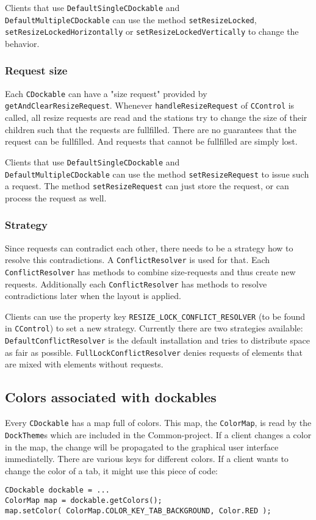 \documentclass[a4paper,10pt]{article}
\newcommand{\src}[1]{\lstinline[basicstyle=\ttfamily]|#1|}
\begin{document}
Clients that use \src{DefaultSingleCDockable} and \\\src{DefaultMultipleCDockable} can use the method \src{setResizeLocked}, \\\src{setResizeLockedHorizontally} or \src{setResizeLockedVertically} to change the behavior.

\subsubsection{Request size}
Each \src{CDockable} can have a "size request" provided by \\\src{getAndClearResizeRequest}. Whenever \src{handleResizeRequest} of \src{CControl} is called, all resize requests are read and the stations try to change the size of their children such that the requests are fullfilled. There are no guarantees that the request can be fullfilled. And requests that cannot be fullfilled are simply lost.

Clients that use \src{DefaultSingleCDockable} and \\\src{DefaultMultipleCDockable} can use the method \src{setResizeRequest} to issue such a request. The method \src{setResizeRequest} can just store the request, or can process the request as well.

\subsubsection{Strategy}
Since requests can contradict each other, there needs to be a strategy how to resolve this contradictions. A \src{ConflictResolver} is used for that. Each \src{ConflictResolver} has methods to combine size-requests and thus create new requests. Additionally each \src{ConflictResolver} has methods to resolve contradictions later when the layout is applied.

Clients can use the property key \src{RESIZE_LOCK_CONFLICT_RESOLVER} (to be found in \src{CControl}) to set a new strategy. Currently there are two strategies available: \src{DefaultConflictResolver} is the default installation and tries to distribute space as fair as possible. \src{FullLockConflictResolver} denies requests of elements that are mixed with elements without requests.

\subsection{Colors associated with dockables}
Every \src{CDockable} has a map full of colors. This map, the \src{ColorMap}, is read by the \src{DockTheme}s which are included in the Common-project. If a client changes a color in the map, the change will be propagated to the graphical user interface immediatelly. There are various keys for different colors. If a client wants to change the color of a tab, it might use this piece of code:
\begin{lstlisting}
CDockable dockable = ...
ColorMap map = dockable.getColors();
map.setColor( ColorMap.COLOR_KEY_TAB_BACKGROUND, Color.RED );
\end{lstlisting}
\end{document}
